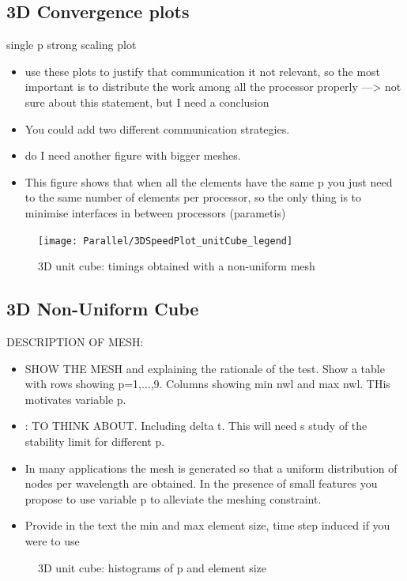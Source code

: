 \subsection{3D Convergence plots}
single p strong scaling plot
\begin{itemize}
\item use these plots to justify that communication it not relevant, so the most important is to distribute the work among all the processor properly ---> not sure about this statement, but I need a conclusion
\item You could add two different communication strategies.
\item do I need another figure with bigger meshes.
\item This figure shows that when all the elements have the same p you just need to the same number of elements per processor, so the only thing is to minimise  interfaces in between processors (parametis)
\end{itemize}
\begin{figure}[!ht]
	\centering
  \texttt{[image: Parallel/3DSpeedPlot\_unitCube\_legend]}
	\caption{3D unit cube: timings obtained with a non-uniform mesh}
	\label{fig:unitCubeNonUniformTimings}
\end{figure}
\clearpage
\subsection{3D Non-Uniform Cube}
DESCRIPTION OF MESH:
\begin{itemize}
\item SHOW THE MESH and explaining the rationale of the test.
Show a table with rows showing p=1,...,9.
Columns showing min nwl and max nwl. THis motivates variable p.
\item: TO THINK ABOUT. Including delta t. This will need s study of the stability limit for different p.
\item In many applications the mesh is generated so that a uniform distribution of nodes per wavelength are obtained. In the presence of small features you propose to use variable p to alleviate the meshing constraint.
\item Provide in the text the min and max element size, time step induced if you were to use 
\end{itemize}

\begin{figure}[!ht]
	\centering
\caption{3D unit cube: histograms of p and element size}
	\label{fig:unitCubeNonUniformTimings}
\end{figure}

